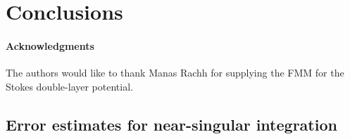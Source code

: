 \documentclass[preprint, 10pt]{elsarticle}
\begin{document}
\section{Conclusions\label{s:conclusions}}


\paragraph{\bf Acknowledgments} The authors would like to thank Manas
Rachh for supplying the FMM for the Stokes double-layer potential.


\begin{appendices}
\section{Error estimates for near-singular integration \label{A:AppendixA}} 
\end{appendices}


 

\end{document}
